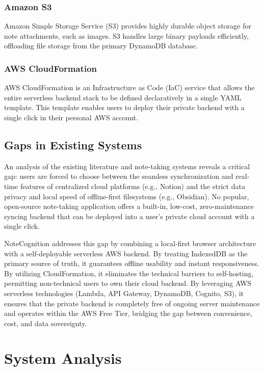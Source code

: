 \documentclass[12pt, a4paper, oneside]{report}
\begin{document}
\subsection{Amazon S3}
Amazon Simple Storage Service (S3) provides highly durable object storage for note attachments, such as images. S3 handles large binary payloads efficiently, offloading file storage from the primary DynamoDB database.

\subsection{AWS CloudFormation}
AWS CloudFormation is an Infrastructure as Code (IaC) service that allows the entire serverless backend stack to be defined declaratively in a single YAML template. This template enables users to deploy their private backend with a single click in their personal AWS account.

\section{Gaps in Existing Systems}

An analysis of the existing literature and note-taking systems reveals a critical gap: users are forced to choose between the seamless synchronization and real-time features of centralized cloud platforms (e.g., Notion) and the strict data privacy and local speed of offline-first filesystems (e.g., Obsidian). No popular, open-source note-taking application offers a built-in, low-cost, zero-maintenance syncing backend that can be deployed into a user's private cloud account with a single click.

NoteCognition addresses this gap by combining a local-first browser architecture with a self-deployable serverless AWS backend. By treating IndexedDB as the primary source of truth, it guarantees offline usability and instant responsiveness. By utilizing CloudFormation, it eliminates the technical barriers to self-hosting, permitting non-technical users to own their cloud backend. By leveraging AWS serverless technologies (Lambda, API Gateway, DynamoDB, Cognito, S3), it ensures that the private backend is completely free of ongoing server maintenance and operates within the AWS Free Tier, bridging the gap between convenience, cost, and data sovereignty.

\chapter{System Analysis}
\end{document}
